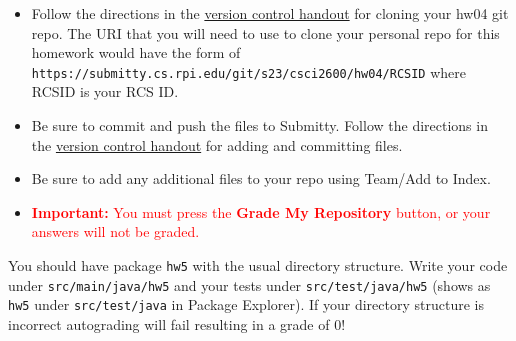\documentclass[11pt]{article}
\begin{document}
\noindent{}
\par


\begin{itemize}
\item  
Follow the directions in the \href{https://www.cs.rpi.edu/academics/courses/spring23/csci2600/Documents/eclipse_and_git.pdf}{version control handout} for cloning your hw04 git repo. The URI that you will need to use to clone your personal repo for this homework would have the form of \texttt{https://submitty.cs.rpi.edu/git/s23/csci2600/hw04/RCSID} where RCSID is your RCS ID.

\item
Be sure to commit and push the files to Submitty. Follow the directions in the \href{https://www.cs.rpi.edu/academics/courses/spring23/csci2600/Documents/eclipse_and_git.pdf}{version control handout} for adding and committing files.

\item
Be sure to add any additional files to your repo using Team/Add to Index.

\item
\textcolor{red}{\textbf{Important:} You must press the \textbf{Grade My Repository} button, or your answers will not be graded.}
\end{itemize}

\newline

\noindent You should have package 
\texttt{hw5} with the usual directory structure. Write your code under \texttt{src/main/java/hw5} and your tests under \texttt{src/test/java/hw5} (shows as \texttt{hw5} under \texttt{src/test/java} in Package Explorer). If your directory structure is incorrect autograding will fail resulting in a grade of 0!

\newline
\end{document}
